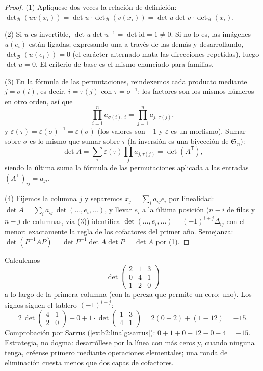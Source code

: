 \begin{proof}
(1) Aplíquese dos veces la relación de definición:
$\det_{\mathcal B}(uv(x_i)) = \det u \cdot \det_{\mathcal
B}(v(x_i)) = \det u \det v \cdot \det_{\mathcal B}(x_i)$.

(2) Si $u$ es invertible, $\det u \det u^{-1} = \det \mathrm{id} =
1 \neq 0$. Si no lo es, las imágenes $u(e_i)$ están ligadas;
expresando una a través de las demás y desarrollando,
$\det_{\mathcal B}(u(e_i)) = 0$ (el carácter alternado mata las
direcciones repetidas), luego $\det u = 0$. El criterio de base es
el mismo enunciado para familias.

(3) En la fórmula de las permutaciones, reindexemos cada producto
mediante $j = \sigma(i)$, es decir, $i = \tau(j)$ con $\tau =
\sigma^{-1}$: los factores son los mismos números en otro orden,
así que
\[
\prod_{i=1}^{n} a_{\sigma(i),\,i} = \prod_{j=1}^{n}
a_{j,\,\tau(j)} ,
\]
y $\varepsilon(\tau) = \varepsilon(\sigma)^{-1} =
\varepsilon(\sigma)$ (los valores son $\pm1$ y $\varepsilon$ es un
morfismo). Sumar sobre $\sigma$ es lo mismo que sumar sobre $\tau$
(la inversión es una biyección de $\mathfrak{S}_n$):
\[
\det A = \sum_{\tau}\varepsilon(\tau)\prod_j a_{j,\tau(j)}
= \det(A^{\mathsf T}),
\]
siendo la última suma la fórmula de las permutaciones aplicada a
las entradas  $(A^{\mathsf T})_{ij} = a_{ji}$.

(4) Fijemos la columna $j$ y separemos $x_j = \sum_i a_{ij} e_i$ por
linealidad: $\det A = \sum_i a_{ij}\, \det(\dots, e_i, \dots)$, y
llevar $e_i$ a la última posición ($n - i$  de filas
y $n - j$ de columnas, vía (3)) identifica $\det(\dots, e_i, \dots)
= (-1)^{i+j}\Delta_{ij}$ con el menor: exactamente la regla de los
cofactores del primer año. Semejanza: $\det(P^{-1}AP) = \det
P^{-1}\det A \det P = \det A$ por (1).
\end{proof}

\begin{example}\label{ex:b2:linalg:cofactorwork}
Calculemos
\[
\det\begin{pmatrix}
2 & 1 & 3\\
0 & 4 & 1\\
1 & 2 & 0
\end{pmatrix}
\]
a lo largo de la primera columna (con la pereza que permite un
cero: uno). Los signos siguen el tablero $(-1)^{i+j}$:
\[
2\,\det\begin{pmatrix}4 & 1\\ 2 & 0\end{pmatrix}
- 0
+ 1\cdot\det\begin{pmatrix}1 & 3\\ 4 & 1\end{pmatrix}
= 2(0 - 2) + (1 - 12) = -15 .
\]
Comprobación por Sarrus (\cref{ex:b2:linalg:sarrus}): $0 + 1 + 0 -
12 - 0 - 4 = -15$. Estrategia, no dogma: desarróllese por la línea
con más ceros y, cuando ninguna tenga, créense primero mediante
operaciones elementales; una ronda de eliminación cuesta menos que
dos capas de cofactores.
\end{example}

